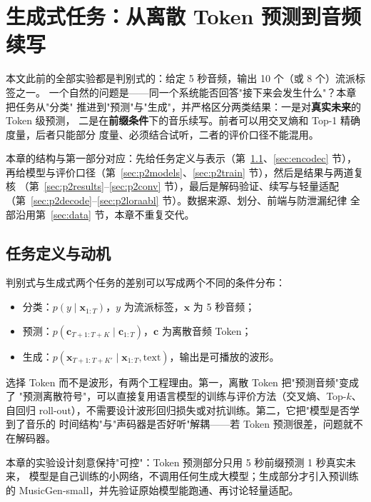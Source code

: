 \section[生成式任务：离散 Token 预测与音频续写]{生成式任务：从离散 Token 预测到音频续写}\label{sec:phase2}

本文此前的全部实验都是判别式的：给定 5 秒音频，输出 10 个（或 8 个）流派标签之一。
一个自然的问题是——同一个系统能否回答"接下来会发生什么"？本章把任务从"分类"
推进到"预测"与"生成"，并严格区分两类结果：一是对\textbf{真实未来}的 Token 级预测，
二是在\textbf{前缀条件}下的音乐续写。前者可以用交叉熵和 Top-1 精确度量，后者只能部分
度量、必须结合试听，二者的评价口径不能混用。

本章的结构与第一部分对应：先给任务定义与表示（第~\ref{sec:p2motivation}、\ref{sec:encodec} 节），
再给模型与评价口径（第~\ref{sec:p2models}、\ref{sec:p2train} 节），然后是结果与两道复核
（第~\ref{sec:p2results}--\ref{sec:p2conv} 节），最后是解码验证、续写与轻量适配
（第~\ref{sec:p2decode}--\ref{sec:p2loraabl} 节）。数据来源、划分、前端与防泄漏纪律
全部沿用第~\ref{sec:data} 节，本章不重复交代。

\subsection{任务定义与动机}\label{sec:p2motivation}

判别式与生成式两个任务的差别可以写成两个不同的条件分布：

\begin{itemize}
  \item 分类：$p(y \mid \mathbf{x}_{1:T})$，$y$ 为流派标签，$\mathbf{x}$ 为 5 秒音频；
  \item 预测：$p(\mathbf{c}_{T+1:T+K} \mid \mathbf{c}_{1:T})$，$\mathbf{c}$ 为离散音频 Token；
  \item 生成：$p(\mathbf{x}_{T+1:T+K'} \mid \mathbf{x}_{1:T}, \text{text})$，输出是可播放的波形。
\end{itemize}

选择 Token 而不是波形，有两个工程理由。第一，离散 Token 把"预测音频"变成了
"预测离散符号"，可以直接复用语言模型的训练与评价方法（交叉熵、Top-$k$、自回归
roll-out），不需要设计波形回归损失或对抗训练。第二，它把"模型是否学到了音乐的
时间结构"与"声码器是否好听"解耦——若 Token 预测很差，问题就不在解码器。

本章的实验设计刻意保持"可控"：Token 预测部分只用 5 秒前缀预测 1 秒真实未来，
模型是自己训练的小网络，不调用任何生成大模型；生成部分才引入预训练的
MusicGen-small，并先验证原始模型能跑通、再讨论轻量适配。

